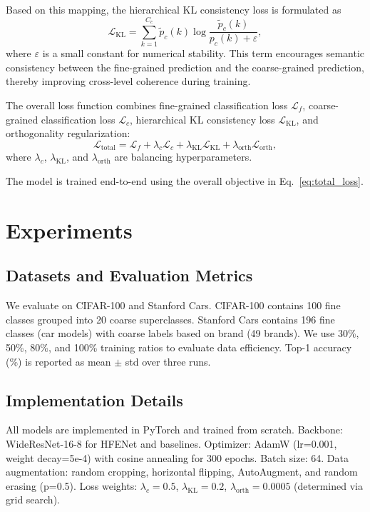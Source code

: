 \documentclass[pdflatex,sn-mathphys-num]{sn-jnl}
\theoremstyle{thmstyleone}%
\theoremstyle{thmstyletwo}%
\theoremstyle{thmstylethree}%
\begin{document}
Based on this mapping, the hierarchical KL consistency loss is formulated as
\begin{equation}
\mathcal{L}_{\mathrm{KL}} = \sum_{k=1}^{C_c} \tilde{p}_c(k)\log\frac{\tilde{p}_c(k)}{p_c(k)+\varepsilon},
\label{eq:kl_loss}
\end{equation}
where $\varepsilon$ is a small constant for numerical stability. 
This term encourages semantic consistency between the fine-grained prediction and the coarse-grained prediction, thereby improving cross-level coherence during training.

The overall loss function combines fine-grained classification loss $\mathcal{L}_f$, coarse-grained classification loss $\mathcal{L}_c$, hierarchical KL consistency loss $\mathcal{L}_{\mathrm{KL}}$, and orthogonality regularization:
\begin{equation}
\mathcal{L}_{\text{total}} = \mathcal{L}_f + \lambda_c \mathcal{L}_c + \lambda_{\mathrm{KL}} \mathcal{L}_{\mathrm{KL}} + \lambda_{\mathrm{orth}} \mathcal{L}_{\mathrm{orth}},
\label{eq:total_loss}
\end{equation}
where $\lambda_c$, $\lambda_{\mathrm{KL}}$, and $\lambda_{\mathrm{orth}}$ are balancing hyperparameters.

The model is trained end-to-end using the overall objective in Eq.~\eqref{eq:total_loss}.

\section{Experiments}
\label{sec:experiments}

\subsection{Datasets and Evaluation Metrics}
We evaluate on CIFAR-100 and Stanford Cars. CIFAR-100 contains 100 fine classes grouped into 20 coarse superclasses. Stanford Cars contains 196 fine classes (car models) with coarse labels based on brand (49 brands). We use 30\%, 50\%, 80\%, and 100\% training ratios to evaluate data efficiency. Top-1 accuracy (\%) is reported as mean $\pm$ std over three runs.

\subsection{Implementation Details}
All models are implemented in PyTorch and trained from scratch. Backbone: WideResNet-16-8 for HFENet and baselines. Optimizer: AdamW (lr=0.001, weight decay=5e-4) with cosine annealing for 300 epochs. Batch size: 64. Data augmentation: random cropping, horizontal flipping, AutoAugment, and random erasing (p=0.5). Loss weights: $\lambda_c=0.5$, $\lambda_{\mathrm{KL}}=0.2$, $\lambda_{\mathrm{orth}}=0.0005$ (determined via grid search).
\end{document}
